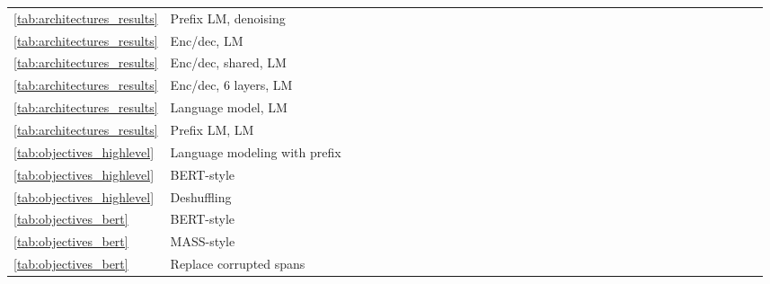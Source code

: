 \documentclass[twoside,11pt]{article}
\newcommand{\bsl}{\makebox[0pt][r]{\raisebox{0.05em}{}}}
\begin{document}
\begin{table}[!ht]
\begin{minipage}{0.85\pdfpagewidth}
\begin{tabular}{llccccccccccccccccccccccccccccccccc}
\ref{tab:architectures_results} & Prefix LM, denoising &  &  &  &  &  &  &  &  &  &  &  &  &  &  &  &  &  &  &  &  &  &  &  &  &  &  &  &  &  &  &  &  &  \\
\ref{tab:architectures_results} & Enc/dec, LM &  &  &  &  &  &  &  &  &  &  &  &  &  &  &  &  &  &  &  &  &  &  &  &  &  &  &  &  &  &  &  &  &  \\
\ref{tab:architectures_results} & Enc/dec, shared, LM &  &  &  &  &  &  &  &  &  &  &  &  &  &  &  &  &  &  &  &  &  &  &  &  &  &  &  &  &  &  &  &  &  \\
\ref{tab:architectures_results} & Enc/dec, 6 layers, LM &  &  &  &  &  &  &  &  &  &  &  &  &  &  &  &  &  &  &  &  &  &  &  &  &  &  &  &  &  &  &  &  &  \\
\ref{tab:architectures_results} & Language model, LM &  &  &  &  &  &  &  &  &  &  &  &  &  &  &  &  &  &  &  &  &  &  &  &  &  &  &  &  &  &  &  &  &  \\
\ref{tab:architectures_results} & Prefix LM, LM &  &  &  &  &  &  &  &  &  &  &  &  &  &  &  &  &  &  &  &  &  &  &  &  &  &  &  &  &  &  &  &  &  \\
\cmidrule(r){1-2} \cmidrule(lr){3-15} \cmidrule(lr){16-18} \cmidrule(lr){19-20} \cmidrule(lr){21-32} \cmidrule(l){33-35}
\ref{tab:objectives_highlevel} & Language modeling with prefix &  &  &  &  &  &  &  &  &  &  &  &  &  &  &  &  &  &  &  &  &  &  &  &  &  &  &  &  &  &  &  &  &  \\
\ref{tab:objectives_highlevel} & BERT-style \citep{devlin2018bert} &  &  &  &  &  &  &  &  &  &  &  &  &  &  &  &  &  &  &  &  &  &  &  &  &  &  &  &  &  &  &  &  &  \\
\ref{tab:objectives_highlevel} & Deshuffling &  &  &  &  &  &  &  &  &  &  &  &  &  &  &  &  &  &  &  &  &  &  &  &  &  &  &  &  &  &  &  &  &  \\
\cmidrule(r){1-2} \cmidrule(lr){3-15} \cmidrule(lr){16-18} \cmidrule(lr){19-20} \cmidrule(lr){21-32} \cmidrule(l){33-35}
\ref{tab:objectives_bert} & BERT-style \citep{devlin2018bert} &  &  &  &  &  &  &  &  &  &  &  &  &  &  &  &  &  &  &  &  &  &  &  &  &  &  &  &  &  &  &  &  &  \\
\ref{tab:objectives_bert} & MASS-style \citep{song2019mass} &  &  &  &  &  &  &  &  &  &  &  &  &  &  &  &  &  &  &  &  &  &  &  &  &  &  &  &  &  &  &  &  &  \\
\ref{tab:objectives_bert} & \bsl Replace corrupted spans &  &  &  &  &  &  &  &  &  &  &  &  &  &  &  &  &  &  &  &  &  &  &  &  &  &  &  &  &  &  &  &  &  \\

\end{tabular}
\end{minipage}
\end{table}
\end{document}
